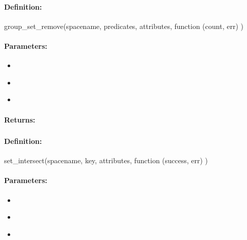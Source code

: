 \paragraph{Definition:}
\begin{javascriptcode}
group_set_remove(spacename, predicates, attributes, function (count, err) {})
\end{javascriptcode}
\paragraph{Parameters:}
\begin{itemize}[noitemsep]
\item {}\\

\item {}\\

\item {}\\

\end{itemize}

\paragraph{Returns:}


\pagebreak
\subsubsection{}
\label{api:nodejs:set_intersect}


\paragraph{Definition:}
\begin{javascriptcode}
set_intersect(spacename, key, attributes, function (success, err) {})
\end{javascriptcode}
\paragraph{Parameters:}
\begin{itemize}[noitemsep]
\item {}\\

\item {}\\

\item {}\\

\end{itemize}


